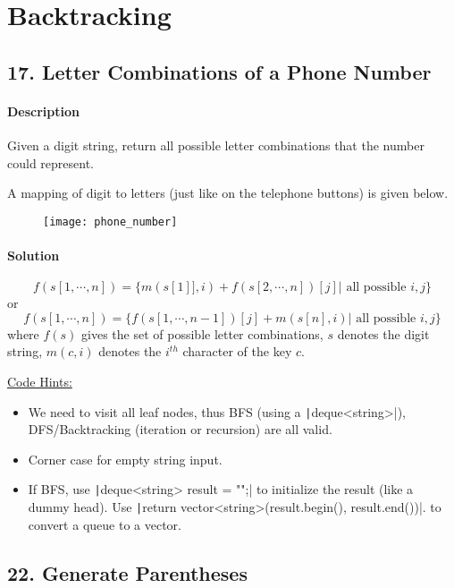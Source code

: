 \section{Backtracking}

\subsection{17. Letter Combinations of a Phone Number}

\paragraph{Description}
Given a digit string, return all possible letter combinations that the number could represent.

A mapping of digit to letters (just like on the telephone buttons) is given below.

\begin{figure}[ht]
    \centering
    \texttt{[image: phone\_number]}
    \label{fig:phone_number}
\end{figure}

\paragraph{Solution}

$$f(s[1,\cdots,n])=\{m(s[1]],i)+f(s[2,\cdots,n])[j]|\text{ all possible } i,j\}$$
or
$$f(s[1,\cdots,n])=\{f(s[1,\cdots,n-1])[j]+m(s[n],i)|\text{ all possible } i,j\}$$
where $f(s)$ gives the set of possible letter combinations, $s$ denotes the digit string, $m(c,i)$ denotes the $i^{th}$ character of the key $c$.


\underline{Code Hints:}
\begin{itemize}
    \item We need to visit all leaf nodes, thus BFS (using a \texttt|deque<string>|), DFS/Backtracking (iteration or recursion) are all valid.
    \item Corner case for empty string input.
    \item If BFS, use \texttt|deque<string> result = {""};| to initialize the result (like a dummy head). Use \texttt|return vector<string>(result.begin(), result.end())|. to convert a queue to a vector.
\end{itemize}

\subsection{22. Generate Parentheses}

